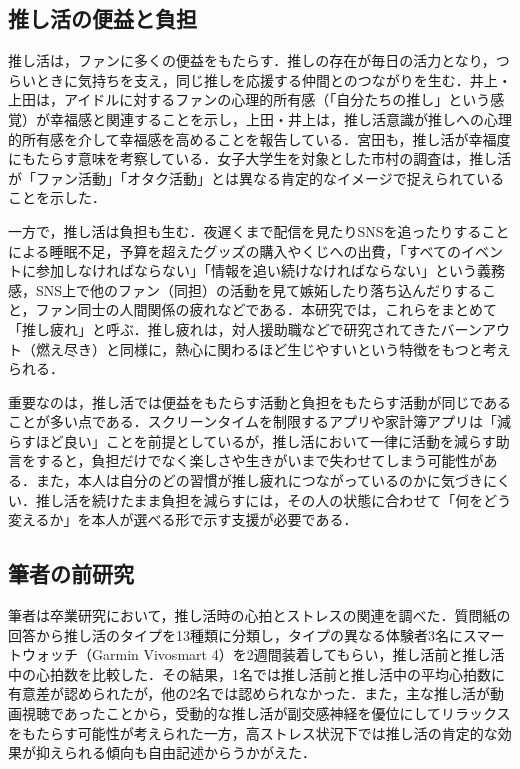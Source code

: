 \subsection{推し活の便益と負担}
推し活は，ファンに多くの便益をもたらす．推しの存在が毎日の活力となり，つらいときに気持ちを支え，同じ推しを応援する仲間とのつながりを生む．井上・上田\cite{inoue2023}は，アイドルに対するファンの心理的所有感（「自分たちの推し」という感覚）が幸福感と関連することを示し，上田・井上\cite{ueda2023}は，推し活意識が推しへの心理的所有感を介して幸福感を高めることを報告している．宮田\cite{miyata2024}も，推し活が幸福度にもたらす意味を考察している．女子大学生を対象とした市村\cite{ichimura2025}の調査は，推し活が「ファン活動」「オタク活動」とは異なる肯定的なイメージで捉えられていることを示した．

一方で，推し活は負担も生む．夜遅くまで配信を見たりSNSを追ったりすることによる睡眠不足，予算を超えたグッズの購入やくじへの出費，「すべてのイベントに参加しなければならない」「情報を追い続けなければならない」という義務感，SNS上で他のファン（同担）の活動を見て嫉妬したり落ち込んだりすること，ファン同士の人間関係の疲れなどである．本研究では，これらをまとめて「推し疲れ」と呼ぶ．推し疲れは，対人援助職などで研究されてきたバーンアウト（燃え尽き）\cite{maslach1981,kubo2007}と同様に，熱心に関わるほど生じやすいという特徴をもつと考えられる．

重要なのは，推し活では便益をもたらす活動と負担をもたらす活動が同じであることが多い点である．スクリーンタイムを制限するアプリや家計簿アプリは「減らすほど良い」ことを前提としているが，推し活において一律に活動を減らす助言をすると，負担だけでなく楽しさや生きがいまで失わせてしまう可能性がある．また，本人は自分のどの習慣が推し疲れにつながっているのかに気づきにくい．推し活を続けたまま負担を減らすには，その人の状態に合わせて「何をどう変えるか」を本人が選べる形で示す支援が必要である．

\subsection{筆者の前研究}
筆者は卒業研究\cite{imai2025hr}において，推し活時の心拍とストレスの関連を調べた．質問紙の回答から推し活のタイプを13種類に分類し，タイプの異なる体験者3名にスマートウォッチ（Garmin Vivosmart 4）を2週間装着してもらい，推し活前と推し活中の心拍数を比較した．その結果，1名では推し活前と推し活中の平均心拍数に有意差が認められたが，他の2名では認められなかった．また，主な推し活が動画視聴であったことから，受動的な推し活が副交感神経を優位にしてリラックスをもたらす可能性が考えられた一方，高ストレス状況下では推し活の肯定的な効果が抑えられる傾向も自由記述からうかがえた．

